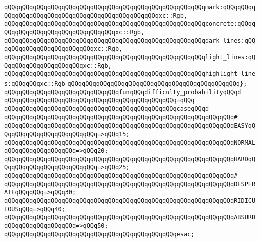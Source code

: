 \verb|qQQqqQQqqQQqqQQqqQQqqQQqqQQqqQQqqQQqqQQqqQQqqQQqqQQqqQQqmark:qQQqqQQqqQQqqQQqqQQqqQQqqQQqqQQqqQQqqQQqqQQqqQQqqQQqxc::Rgb,|\newline
\verb|qQQqqQQqqQQqqQQqqQQqqQQqqQQqqQQqqQQqqQQqqQQqqQQqqQQqqQQqconcrete:qQQqqQQqqQQqqQQqqQQqqQQqqQQqqQQqqQQqxc::Rgb,|\newline
\verb|qQQqqQQqqQQqqQQqqQQqqQQqqQQqqQQqqQQqqQQqqQQqqQQqqQQqqQQqdark_lines:qQQqqQQqqQQqqQQqqQQqqQQqqQQqxc::Rgb,|\newline
\verb|qQQqqQQqqQQqqQQqqQQqqQQqqQQqqQQqqQQqqQQqqQQqqQQqqQQqqQQqlight_lines:qQQqqQQqqQQqqQQqqQQqqQQqxc::Rgb,|\newline
\verb|qQQqqQQqqQQqqQQqqQQqqQQqqQQqqQQqqQQqqQQqqQQqqQQqqQQqqQQqhighlight_lines:qQQqqQQqxc::Rgb|\newline
\verb|qQQqqQQqqQQqqQQqqQQqqQQqqQQqqQQqqQQqqQQqqQQqqQQq};|\newline
\newline
\verb|qQQqqQQqqQQqqQQqqQQqqQQqqQQqqQQqfunqQQqdifficulty_probabilityqQQqd|\newline
\verb|qQQqqQQqqQQqqQQqqQQqqQQqqQQqqQQqqQQqqQQqqQQqqQQq=qQQq|\newline
\verb|qQQqqQQqqQQqqQQqqQQqqQQqqQQqqQQqqQQqqQQqqQQqqQQqcaseqQQqd|\newline
\verb|qQQqqQQqqQQqqQQqqQQqqQQqqQQqqQQqqQQqqQQqqQQqqQQqqQQqqQQqqQQqqQQq#|\newline
\verb|qQQqqQQqqQQqqQQqqQQqqQQqqQQqqQQqqQQqqQQqqQQqqQQqqQQqqQQqqQQqqQQqEASYqQQqqQQqqQQqqQQqqQQqqQQqqQQq=>qQQq15;|\newline
\verb|qQQqqQQqqQQqqQQqqQQqqQQqqQQqqQQqqQQqqQQqqQQqqQQqqQQqqQQqqQQqqQQqNORMALqQQqqQQqqQQqqQQqqQQq=>qQQq20;|\newline
\verb|qQQqqQQqqQQqqQQqqQQqqQQqqQQqqQQqqQQqqQQqqQQqqQQqqQQqqQQqqQQqqQQqHARDqQQqqQQqqQQqqQQqqQQqqQQqqQQq=>qQQq25;|\newline
\verb|qQQqqQQqqQQqqQQqqQQqqQQqqQQqqQQqqQQqqQQqqQQqqQQqqQQqqQQqqQQqqQQq#|\newline
\verb|qQQqqQQqqQQqqQQqqQQqqQQqqQQqqQQqqQQqqQQqqQQqqQQqqQQqqQQqqQQqqQQqDESPERATEqQQqqQQq=>qQQq30;|\newline
\verb|qQQqqQQqqQQqqQQqqQQqqQQqqQQqqQQqqQQqqQQqqQQqqQQqqQQqqQQqqQQqqQQqRIDICULOUSqQQq=>qQQq40;|\newline
\verb|qQQqqQQqqQQqqQQqqQQqqQQqqQQqqQQqqQQqqQQqqQQqqQQqqQQqqQQqqQQqqQQqABSURDqQQqqQQqqQQqqQQqqQQq=>qQQq50;|\newline
\verb|qQQqqQQqqQQqqQQqqQQqqQQqqQQqqQQqqQQqqQQqqQQqqQQqesac;|\newline
\newline
